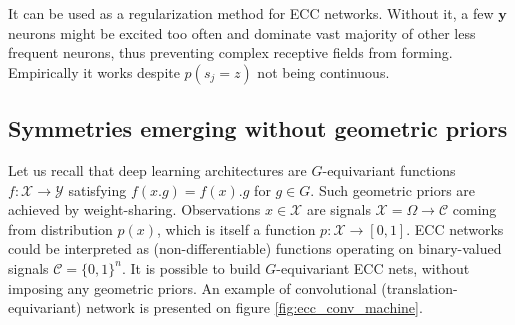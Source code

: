 \documentclass[12pt]{article}
\begin{document}
It can be used as a regularization method for ECC networks. Without it, a few $\boldsymbol{y}$ neurons might be excited too often and dominate vast majority of other less frequent neurons, thus preventing complex receptive fields from forming. Empirically it works despite $p(s_j=z)$ not being continuous.


\subsection{Symmetries emerging without geometric priors}

Let us recall that deep learning architectures are  $G$-equivariant functions $f:\mathcal{X}\rightarrow \mathcal{Y}$ satisfying $f(x.g)=f(x).g$ for $g\in G$. Such geometric priors are achieved by weight-sharing. Observations $x\in \mathcal{X}$ are signals $\mathcal{X}=\Omega \rightarrow \mathcal{C}$ coming from distribution $p(x)$, which is itself a function $p:\mathcal{X} \rightarrow [0,1]$.   
ECC networks could be interpreted as (non-differentiable) functions operating on binary-valued signals $\mathcal{C}=\{0,1\}^n$. It is possible to build $G$-equivariant ECC nets, without imposing any geometric priors. An example of convolutional (translation-equivariant) network is presented on figure \ref{fig:ecc_conv_machine}.
\end{document}
